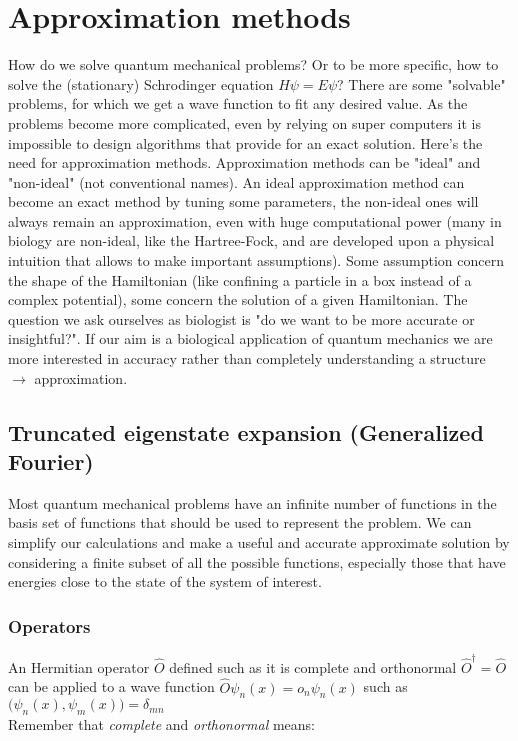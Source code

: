 \graphicspath{{chapters/05/}}
\chapter{Approximation methods}
How do we solve quantum mechanical problems? Or to be more specific, how to solve the (stationary) Schrodinger equation $ H \psi = E \psi$? There are some "solvable" problems, for which we get a wave function to fit any desired value.
As the problems become more complicated, even by relying on super computers it is impossible to design algorithms that provide for an exact solution.
Here's the need for approximation methods.
Approximation methods can be "ideal" and "non-ideal" (not conventional names).
An ideal approximation method can become an exact method by tuning some parameters, the non-ideal ones will always remain an approximation, even with huge computational power (many in biology are non-ideal, like the Hartree-Fock, and are developed upon a physical intuition that allows to make important assumptions).
Some assumption concern the shape of the Hamiltonian (like confining a particle in a box instead of a complex potential), some concern the solution of a given Hamiltonian.
The question we ask ourselves as biologist is "do we want to be more accurate or insightful?".
If our aim is a biological application of quantum mechanics we are more interested in accuracy rather than completely understanding a structure $\rightarrow$ approximation.

\section{Truncated eigenstate expansion (Generalized Fourier)}
Most quantum mechanical problems have an infinite number of functions in the basis set of functions that should be used to represent the problem.
We can simplify our calculations and make a useful and accurate approximate solution by considering a finite subset of all the possible functions, especially those that have energies close to the state of the system of interest.

	\subsection{Operators}
	An Hermitian operator $\hat{O}$ defined such as it is complete and orthonormal $\hat{O}^\dagger=\hat{O}$ can be applied to a wave function $\hat{O}\psi_n(x)=o_n\psi_n(x)$ such as $\bigl(\psi_n(x),\psi_m(x)\bigr)=\delta_{mn}$\\
	Remember that \textit{complete} and \textit{orthonormal} means:

